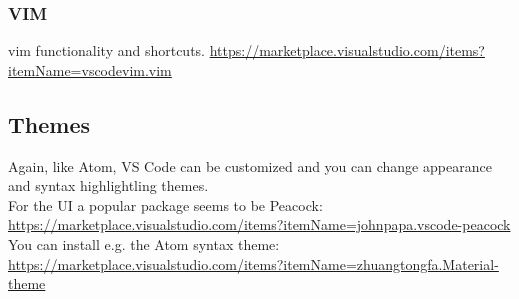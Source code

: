 \documentclass[10pt,a4paper]{article}
\begin{document}
\subsubsection{VIM}
vim functionality and shortcuts. \url{https://marketplace.visualstudio.com/items?itemName=vscodevim.vim}

\subsection{Themes}

Again, like Atom, VS Code can be customized and you can change appearance and syntax highlightling themes.\\
For the UI a popular package seems to be Peacock: \url{https://marketplace.visualstudio.com/items?itemName=johnpapa.vscode-peacock}\\
You can install e.g. the Atom syntax theme: \url{https://marketplace.visualstudio.com/items?itemName=zhuangtongfa.Material-theme}
\end{document}
